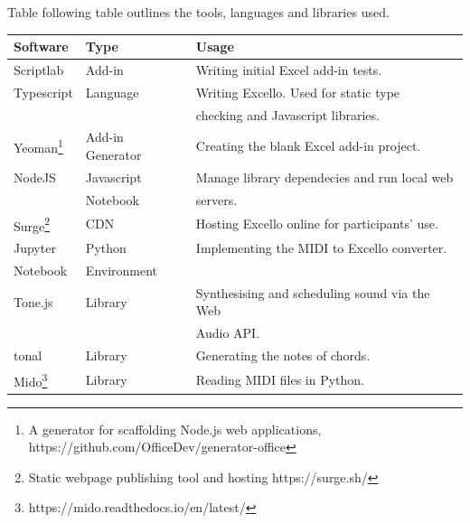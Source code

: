Table following table outlines the tools, languages and libraries used.

\begin{table}[ht]
\centering
\vspace{1pt}
\begin{tabular}{|l|l|l|} \hline
\textbf{Software}&\textbf{Type}&\textbf{Usage}\\ \hline
Scriptlab&Add-in&Writing initial Excel add-in tests. \\ \hline
Typescript&Language&Writing Excello. Used for static type\\
&&checking and Javascript libraries. \\ \hline
Yeoman\footnote{A generator for scaffolding Node.js web applications, https://github.com/OfficeDev/generator-office}&Add-in Generator&Creating the blank Excel add-in project.\\ \hline
NodeJS&Javascript&Manage library dependecies and run local web\\
&Notebook&servers. \\ \hline
Surge\footnote{Static webpage publishing tool and hosting https://surge.sh/}&CDN&Hosting Excello online for participants' use.\\ \hline
Jupyter&Python&Implementing the MIDI to Excello converter.\\ Notebook&Environment& \\ \hline
Tone.js&Library&Synthesising and scheduling sound via the Web\\
&&Audio API.\\ \hline
tonal&Library&Generating the notes of chords.\\ \hline
Mido\footnote{https://mido.readthedocs.io/en/latest/}&Library&Reading MIDI files in Python.\\ \hline
\end{tabular}
\label{intro:tools}
\end{table}

